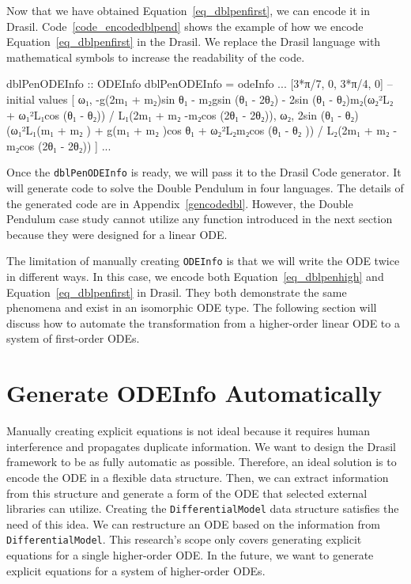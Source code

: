 Now that we have obtained Equation~\ref{eq_dblpenfirst}, we can encode it in Drasil. Code~\ref{code_encodedblpend} shows the example of how we encode Equation~\ref{eq_dblpenfirst} in the Drasil. We replace the Drasil language with mathematical symbols to increase the readability of the code.
\begin{listing}[ht]
\begin{haskell1}
dblPenODEInfo :: ODEInfo
dblPenODEInfo = odeInfo
...
[3*π/7, 0, 3*π/4, 0] -- initial values
[ ω₁,
  -g(2m₁ + m₂)sin θ₁ - m₂gsin (θ₁ - 2θ₂) - 2sin (θ₁ - θ₂)m₂(ω₂²L₂ + ω₁²L₁cos (θ₁ - θ₂)) / L₁(2m₁ + m₂ -m₂cos (2θ₁ - 2θ₂)),
  ω₂,
  2sin (θ₁ - θ₂)(ω₁²L₁(m₁ + m₂ ) + g(m₁ + m₂ )cos θ₁ + ω₂²L₂m₂cos (θ₁ - θ₂ )) / L₂(2m₁ + m₂ -m₂cos (2θ₁ - 2θ₂))
]
...
\end{haskell1}
\label{code_encodedblpend}
\end{listing}

Once the \verb|dblPenODEInfo| is ready, we will pass it to the Drasil Code generator. It will generate code to solve the Double Pendulum in four languages. The details of the generated code are in Appendix~\ref{gencodedbl}. However, the Double Pendulum case study cannot utilize any function introduced in the next section because they were designed for a linear ODE.

The limitation of manually creating \verb|ODEInfo| is that we will write the ODE twice in different ways. In this case, we encode both Equation~\ref{eq_dblpenhigh} and Equation~\ref{eq_dblpenfirst} in Drasil. They both demonstrate the same phenomena and exist in an isomorphic ODE type. The following section will discuss how to automate the transformation from a higher-order linear ODE to a system of first-order ODEs.

\section{Generate ODEInfo Automatically}
Manually creating explicit equations is not ideal because it requires human interference and propagates duplicate information. We want to design the Drasil framework to be as fully automatic as possible. Therefore, an ideal solution is to encode the ODE in a flexible data structure. Then, we can extract information from this structure and generate a form of the ODE that selected external libraries can utilize. Creating the \verb|DifferentialModel| data structure satisfies the need of this idea. We can restructure an ODE based on the information from \verb|DifferentialModel|. This research's scope only covers generating explicit equations for a single higher-order ODE. In the future, we want to generate explicit equations for a system of higher-order ODEs.


